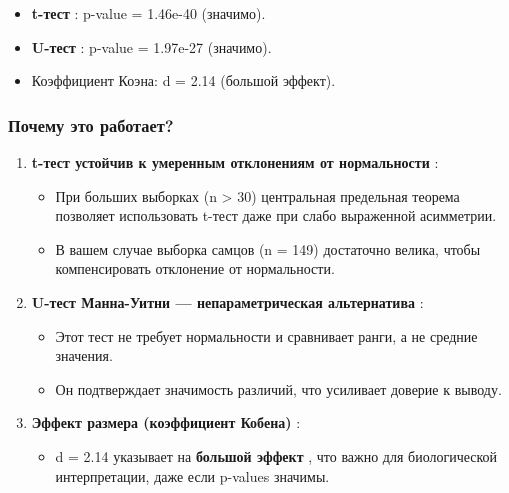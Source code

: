 \documentclass[
  letterpaper,
  DIV=11,
  numbers=noendperiod]{scrreprt}
\providecommand{\tightlist}{%
  \setlength{\itemsep}{0pt}\setlength{\parskip}{0pt}}
\begin{document}
\begin{itemize}
  \begin{itemize}
  \item
    \textbf{t-тест} : p-value = 1.46e-40 (значимо).
  \item
    \textbf{U-тест} : p-value = 1.97e-27 (значимо).
  \item
    Коэффициент Коэна: d = 2.14 (большой эффект).
  \end{itemize}

  \subsubsection{\texorpdfstring{\textbf{Почему это
  работает?}}{Почему это работает?}}\label{ux43fux43eux447ux435ux43cux443-ux44dux442ux43e-ux440ux430ux431ux43eux442ux430ux435ux442}

  \begin{enumerate}
  \def\labelenumi{\arabic{enumi}.}
  \item
    \textbf{t-тест устойчив к умеренным отклонениям от нормальности} :

    \begin{itemize}
    \item
      При больших выборках (n \textgreater{} 30) центральная предельная
      теорема позволяет использовать t-тест даже при слабо выраженной
      асимметрии.
    \item
      В вашем случае выборка самцов (n = 149) достаточно велика, чтобы
      компенсировать отклонение от нормальности.
    \end{itemize}
  \item
    \textbf{U-тест Манна-Уитни --- непараметрическая альтернатива} :

    \begin{itemize}
    \item
      Этот тест не требует нормальности и сравнивает ранги, а не средние
      значения.
    \item
      Он подтверждает значимость различий, что усиливает доверие к
      выводу.
    \end{itemize}
  \item
    \textbf{Эффект размера (коэффициент Кобена)} :

    \begin{itemize}
    \tightlist
    \item
      d = 2.14 указывает на \textbf{большой эффект} , что важно для
      биологической интерпретации, даже если p-values значимы.
    \end{itemize}
  \end{enumerate}
\end{itemize}
\end{document}
